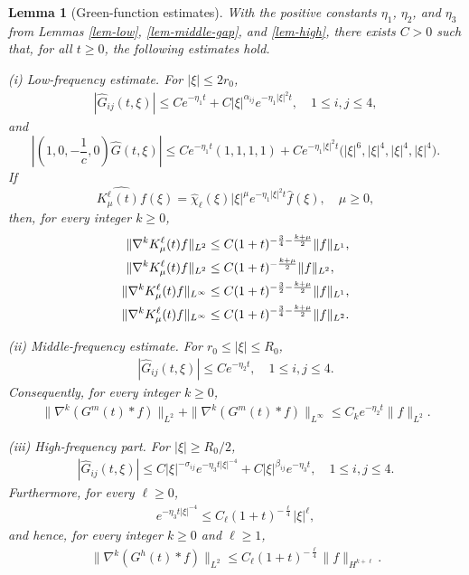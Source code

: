 \documentclass[10pt,reqno]{amsart}
\numberwithin{equation}{section}
\newtheorem{lem}[thm]{Lemma}
\begin{document}
\begin{lem}[Green-function estimates]\label{lem-green-estimates}
 With the positive constants $\eta_1$, $\eta_2$, and $\eta_3$ from Lemmas \ref{lem-low}, \ref{lem-middle-gap}, and \ref{lem-high}, there exists $C>0$ such that, for all $t\ge0$, the following estimates hold.

\smallskip
\noindent\emph{(i) Low-frequency estimate.} For $|\xi|\le2r_0$,
\begin{align}\label{low-G-pointwise}
|\widehat G_{ij}(t,\xi)|
\le Ce^{-\eta_1  t}+C|\xi|^{\alpha_{ij}}e^{-\eta_1 |\xi|^2t},
\quad 1\le i,j\le4,
\end{align}
and
\[%
\left|\left(1,0,-\frac1c,0\right)\widehat G(t,\xi)\right| \le Ce^{-\eta_1  t}(1,1,1,1) +Ce^{-\eta_1 |\xi|^2t} \big(|\xi|^6,|\xi|^4,|\xi|^4,|\xi|^4\big).
\]%
If
\[
\widehat{K_\mu^\ell(t)f}(\xi)
=\widehat\chi_\ell(\xi)|\xi|^\mu e^{-\eta_1 |\xi|^2t}\widehat f(\xi),
\quad \mu\ge0,
\]
then, for every integer $k\ge0$,
\begin{align}%
\|\nabla^kK_\mu^\ell(t)f\|_{L^2}
&\le C(1+t)^{-\frac34-\frac{k+\mu}{2}}\|f\|_{L^1}, \notag \\
\|\nabla^kK_\mu^\ell(t)f\|_{L^2}
&\le C(1+t)^{-\frac{k+\mu}{2}}\|f\|_{L^2},  \notag \\
\label{low-kernel-L1inf}
\|\nabla^kK_\mu^\ell(t)f\|_{L^\infty}
&\le C(1+t)^{-\frac32-\frac{k+\mu}{2}}\|f\|_{L^1},\\
\label{low-kernel-L2inf}
\|\nabla^kK_\mu^\ell(t)f\|_{L^\infty}
&\le C(1+t)^{-\frac34-\frac{k+\mu}{2}}\|f\|_{L^2}.
\end{align}

\smallskip
\noindent\emph{(ii) Middle-frequency estimate.} For $r_0\le|\xi|\le R_0$,
\begin{align}\label{middle-decay}
|\widehat G_{ij}(t,\xi)|\le Ce^{-\eta_2   t},
\quad 1\le i,j\le4.
\end{align}
Consequently, for every integer $k\ge0$,
\begin{align}\label{middle-G-operator}
\|\nabla^k(G^m(t)*f)\|_{L^2}
+\|\nabla^k(G^m(t)*f)\|_{L^\infty}
\le C_k e^{-\eta_2   t}\|f\|_{L^2}.
\end{align}

\smallskip
\noindent\emph{(iii) High-frequency part.} For $|\xi|\ge R_0/2$,
\begin{align}\label{high-G-pointwise}
|\widehat G_{ij}(t,\xi)|
\le C|\xi|^{-\sigma_{ij}}e^{-\eta_3  t|\xi|^{-4}}
+C|\xi|^{\beta_{ij}}e^{-\eta_3  t},
\quad 1\le i,j\le4.
\end{align}
Furthermore, for every $\ell\ge0$,
\begin{align}\label{regularity-loss-ineq}
e^{-\eta_3  t|\xi|^{-4}}
\le C_\ell(1+t)^{-\frac\ell4}|\xi|^\ell,
\end{align}
and hence, for every integer $k\ge0$ and $\ell\ge1$,
\begin{align}\label{high-linear-general}
\|\nabla^k(G^h(t)*f)\|_{L^2}
\le C_\ell(1+t)^{-\frac\ell4}\|f\|_{H^{k+\ell}}.
\end{align}
\end{lem}
\end{document}
